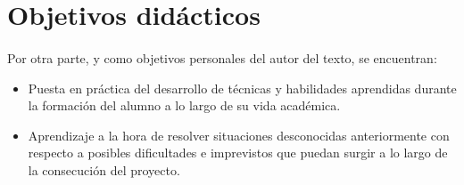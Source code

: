 \section{Objetivos didácticos}

\paragraph{}Por otra parte, y como objetivos personales del autor del texto, se
encuentran:

\begin{itemize}
   \item Puesta en práctica del desarrollo de técnicas y habilidades aprendidas
   durante la formación del alumno a lo largo de su vida académica.

   \item Aprendizaje a la hora de resolver situaciones desconocidas
   anteriormente con respecto a posibles dificultades e imprevistos que puedan
   surgir a lo largo de la consecución del proyecto.
\end{itemize}
